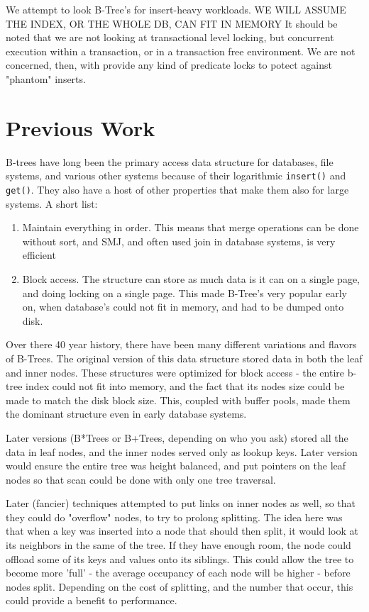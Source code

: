 \documentclass{sig-alternate}
\begin{document}
We attempt to look B-Tree's for insert-heavy workloads. WE WILL ASSUME THE INDEX, OR THE WHOLE DB, CAN FIT IN MEMORY
It should be noted that we are not looking at transactional level locking, but concurrent execution within a transaction, or in a transaction free environment.  We are not concerned, then, with provide any kind of predicate locks to potect against "phantom" inserts.

\section{Previous Work}
B-trees have long been the primary access data structure for databases, file systems, and various other systems because of their logarithmic \texttt{insert()} and \texttt{get()}.
They also have a host of other properties that make them also for large systems.  A short list: 
\begin{enumerate}
\item Maintain everything in order.  This means that merge operations can be done without sort, and SMJ, and often used join in database systems, is very efficient
\item Block access.  The structure can store as much data is it can on a single page, and doing locking on a single page.  This made B-Tree's very popular early on, when database's could not fit in memory, and had to be dumped onto disk.
\end{enumerate}

Over there 40 year history, there have been many different variations and flavors of B-Trees.  The original version of this data structure stored data in both the leaf and inner nodes.  These structures were optimized for block access - the entire b-tree index could not fit into memory, and the fact that its nodes size could be made to match the disk block size.  This, coupled with buffer pools, made them the dominant structure even in early database systems.

Later versions (B*Trees or B+Trees, depending on who you ask) stored all the data in leaf nodes, and the inner nodes served only as lookup keys.  Later version would ensure the entire tree was height balanced, and put pointers on the leaf nodes so that scan could be done with only one tree traversal.  

Later (fancier) techniques attempted to put links on inner nodes as well, so that they could do "overflow" nodes, to try to prolong splitting.  The idea here was that when a key was inserted into a node that should then split, it would look at its neighbors in the same  of the tree. If they have enough room, the node could offload some of its keys and values onto its siblings.  This could allow the tree to become more 'full' - the average occupancy of each node will be higher - before nodes split.  Depending on the cost of splitting, and the number that occur, this could provide a benefit to performance.
\end{document}
